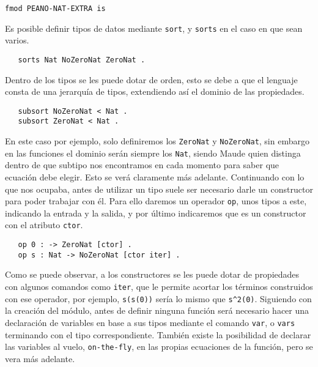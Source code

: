 {\codesize
\begin{verbatim}
fmod PEANO-NAT-EXTRA is
\end{verbatim}
}

Es posible definir tipos de datos mediante \texttt{sort}, y \texttt{sorts} en el caso en que sean varios. \par

{\codesize
\begin{verbatim}
   sorts Nat NoZeroNat ZeroNat .
\end{verbatim}
}

Dentro de los tipos se les puede dotar de orden, esto se debe a que el lenguaje consta de una jerarquía de tipos, extendiendo así el dominio de las propiedades. \par

{\codesize
\begin{verbatim}
   subsort NoZeroNat < Nat .
   subsort ZeroNat < Nat .
\end{verbatim}
}

En este caso por ejemplo, solo definiremos los \texttt{ZeroNat} y \texttt{NoZeroNat}, sin embargo en las funciones el dominio serán siempre los \texttt{Nat}, siendo Maude quien distinga dentro de que subtipo nos encontramos en cada momento para saber que ecuación debe elegir. Esto se verá claramente más adelante. Continuando con lo que nos ocupaba, antes de utilizar un tipo suele ser necesario darle un constructor para poder trabajar con él. Para ello daremos un operador \texttt{op}, unos tipos a este, indicando la entrada y la salida, y por último indicaremos que es un constructor con el atributo \texttt{ctor}. \par

{\codesize
\begin{verbatim}
   op 0 : -> ZeroNat [ctor] .
   op s : Nat -> NoZeroNat [ctor iter] .
\end{verbatim}
}

Como se puede observar, a los constructores se les puede dotar de propiedades con algunos comandos como \texttt{iter}, que le permite acortar los términos construidos con ese operador, por ejemplo, \verb"s(s(0))" sería lo mismo que \verb"s^2(0)". Siguiendo con la creación del módulo, antes de definir ninguna función será necesario hacer una declaración de variables en base a sus tipos mediante el comando \texttt{var}, o \texttt{vars} terminando con el tipo correspondiente. También existe la posibilidad de declarar las variables al vuelo, \texttt{on-the-fly}, en las propias ecuaciones de la función, pero se vera más adelante. \par

